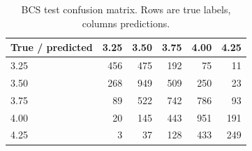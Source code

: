 \begin{table}[htbp]
\centering\small
\caption[BCS test confusion matrix]{BCS test confusion matrix. Rows are true labels, columns predictions.}\label{tab:bcscm}
\begin{tabular}{lrrrrr}
\toprule
True / predicted & 3.25 & 3.50 & 3.75 & 4.00 & 4.25 \\
\midrule
3.25 & 456 & 475 & 192 & 75 & 11 \\
3.50 & 268 & 949 & 509 & 250 & 23 \\
3.75 & 89 & 522 & 742 & 786 & 93 \\
4.00 & 20 & 145 & 443 & 951 & 191 \\
4.25 & 3 & 37 & 128 & 433 & 249 \\
\bottomrule
\end{tabular}
\end{table}

